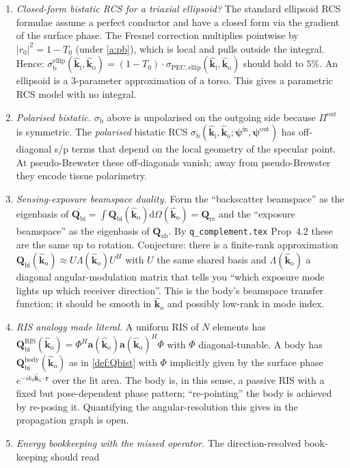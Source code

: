 \documentclass[11pt,a4paper]{article}
\theoremstyle{definition}
\newcommand{\rr}{\mathbf{r}}
\newcommand{\diff}{\mathrm{d}}
\newcommand{\Qabs}{\mathbf{Q}_{\mathrm{ab}}}
\newcommand{\Qref}{\mathbf{Q}_{\mathrm{re}}}
\newcommand{\kin}{\hat{\bm{k}}_{\mathrm{i}}}
\newcommand{\kout}{\hat{\bm{k}}_{\mathrm{o}}}
\newcommand{\sigb}{\sigma_{\mathrm{b}}}
\newcommand{\Qbist}{\mathbf{Q}_{\mathrm{bi}}}
\begin{document}
\begin{enumerate}[leftmargin=1.6em,itemsep=3pt]
\item \emph{Closed-form bistatic RCS for a triaxial ellipsoid?}
The standard ellipsoid RCS formulae assume a perfect conductor and
have a closed form via the gradient of the surface phase.  The
Fresnel correction multiplies pointwise by $|r_0|^2=1-T_0$ (under
\ref{a:pb}), which is local and pulls outside the integral.  Hence:
$\sigb^{\mathrm{ellip}}(\kin,\kout)=
(1-T_0)\cdot\sigma_{\mathrm{PEC,ellip}}(\kin,\kout)$ should hold to
$5\%$.  An ellipsoid is a 3-parameter approximation of a torso.  This
gives a parametric RCS model with no integral.
\item \emph{Polarised bistatic.}  $\sigb$ above is unpolarised on the
outgoing side because $\Pi^{\mathrm{out}}$ is symmetric.  The
\emph{polarised} bistatic RCS $\sigb(\kin,\kout;\bm\psi^{\mathrm{in}}
,\bm\psi^{\mathrm{out}})$ has off-diagonal s/p terms that depend on
the local geometry of the specular point.  At pseudo-Brewster these
off-diagonals vanish; away from pseudo-Brewster they encode tissue
polarimetry.
\item \emph{Sensing-exposure beamspace duality.}  Form the
``backscatter beamspace'' as the eigenbasis of
$\overline{\Qbist}=\int\Qbist(\kout)\diff\Omega(\kout)=\Qref$ and
the ``exposure beamspace'' as the eigenbasis of $\Qabs$.  By
\texttt{q\_complement.tex} Prop~4.2 these are the same up to
rotation.  Conjecture: there is a finite-rank approximation
$\Qbist(\kout)\approx U\Lambda(\kout)U^H$ with $U$ the same shared
basis and $\Lambda(\kout)$ a diagonal angular-modulation matrix that
tells you ``which exposure mode lights up which receiver
direction''.  This is the body's beamspace transfer function; it
should be smooth in $\kout$ and possibly low-rank in mode index.
\item \emph{RIS analogy made literal.}  A uniform RIS of $N$
elements has $\Qbist^{\mathrm{RIS}}(\kout)=
\Phi^H\mathbf{a}(\kout)\mathbf{a}(\kout)^H\Phi$ with $\Phi$
diagonal-tunable.  A body has $\Qbist^{\mathrm{body}}(\kout)$ as in
\cref{def:Qbist} with $\Phi$ implicitly given by the surface phase
$e^{-ik_0\kout\cdot\rr}$ over the lit area.  The body is, in this
sense, a passive RIS with a fixed but pose-dependent phase pattern;
``re-pointing'' the body is achieved by re-posing it.  Quantifying
the angular-resolution this gives in the propagation graph is open.
\item \emph{Energy bookkeeping with the missed operator.}  The
direction-resolved book-keeping should read

\end{enumerate}
\end{document}
